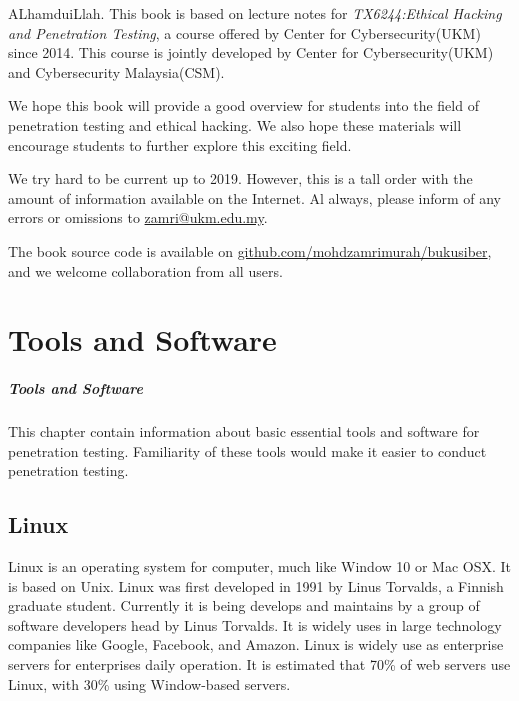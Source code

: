 \documentclass[7x9]{times}
\begin{document}
\begin{preface}
ALhamduiLlah. This book is based on lecture notes for \textit{TX6244:Ethical Hacking and Penetration Testing}, a course offered by Center for Cybersecurity(UKM) since 2014. This course is jointly developed by Center for Cybersecurity(UKM) and Cybersecurity Malaysia(CSM).

We hope this book will provide a good overview for students into the field of penetration testing and ethical hacking. We also hope these materials will encourage students to further explore this exciting field.

We try hard to be current up to 2019. However, this is a tall order with the amount of information available on the Internet. Al always, please inform of any errors or omissions to \url{zamri@ukm.edu.my}.

The book source code is available on \url{github.com/mohdzamrimurah/bukusiber}, and we welcome collaboration from all users.



\end{preface}


\chapter{Tools and Software}


\paragraph{Tools and Software}
This chapter contain information about basic essential tools and software for penetration testing. Familiarity of these tools would make it easier to conduct penetration testing.


\section{Linux}

Linux\cite{sobell2015practical,barrett2016linux} is an operating system for computer, much like Window 10 or Mac OSX. It is based on Unix. Linux was first developed in 1991 by Linus Torvalds, a Finnish graduate student. Currently it is being develops and maintains by a group of software developers head by Linus Torvalds. It is widely uses in large technology companies like Google, Facebook, and Amazon. Linux is widely use as enterprise servers for enterprises daily operation. It is estimated that 70\% of web servers use Linux, with 30\% using Window-based servers.
\end{document}
